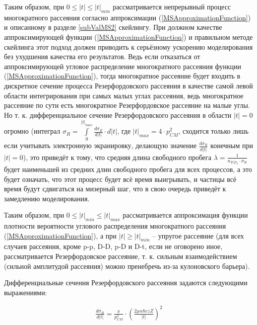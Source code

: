 \documentclass[a4paper,12pt]{article}
\begin{document}
\begin{large}
	Таким образом, при $0 \leq |t| \leq |t|_{min}$ рассматривается непрерывный процесс многократного рассеяния согласно аппроксимации (\ref{MSApproximationFunction}) и описанному в разделе \ref{subValMS2} скейлингу.
	При должном качестве аппроксимирующей функции (\ref{MSApproximationFunction}) и правильном методе скейлинга этот подход должен приводить к серьёзному ускорению моделирования без ухудшения качества его результатов.
	Ведь если отказаться от аппроксимирующей угловое распределение многократного рассеяния функции (\ref{MSApproximationFunction}), тогда многократное рассеяние будет входить в дискретное сечение процесса Резерфордовского рассеяния в качестве самой левой области интегрирования при самых малых углах рассеяния, ведь многократное рассеяние по сути есть многократное Резерфордовское рассеяние на малые углы.
	Но т. к. дифференциальное сечение Резерфордовского рассеяния в области $|t|=0$ огромно (интеграл $\sigma_R=\int \limits_0^{|t|_{max}} \frac{d\sigma_R}{d|t|} \cdot d|t|$, где $|t|_{max}=4\cdot p^2_{CM}$, сходится только лишь если учитывать электронную экранировку, делающую значение $\frac{d\sigma_R}{d|t|}$ конечным при $|t|=0$), это приведёт к тому, что средняя длина свободного пробега $\lambda=\frac{1}{n_{TiD_2} \cdot \sigma_R}$ будет наименьшей из средних длин свободного пробега для всех процессов, а это будет означать, что этот процесс будет всё время выигрывать, и частицы всё время будут сдвигаться на мизерный шаг, что в свою очередь приведёт к замедлению моделирования.
	
	Таким образом, при $0 \leq |t|_{min} \leq|t|_{max}$ рассматривается аппроксимация функции плотности вероятности углового распределения многократного рассеяния (\ref{MSApproximationFunction}), а при $|t| \geq |t|_{min}$ -- упругое рассеяние (для всех случаев рассеяния, кроме p-p, D-D, p-D и D-t, если не оговорено иное, рассматривается Резерфордовское рассеяние, т. к. сильным взаимодействием (сильной амплитудой рассеяния) можно пренебречь из-за кулоновского барьера).
	
	Дифференциальные сечения Резерфордовского рассеяния задаются следующими выражениями:
	
\begin{equation}
\label{DifferentialRutherfordCSDifferentParticles}
\begin{aligned} 
  \frac{d \sigma_R}{d|t|} = \frac{\pi}{p^2_{CM}} \cdot \left( \frac{ 2 \mu \alpha \hbar c z Z}{|t|} \right)^2 
\end{aligned}
\end{equation}


\end{large}
\end{document}
